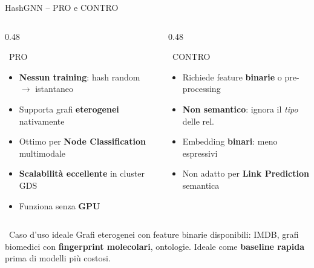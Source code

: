 \documentclass[aspectratio=169]{beamer}
\newcommand{\icoThumb}{\faThumbsUp}
\newcommand{\icoWarn}{\faExclamationTriangle}
\newcommand{\icoIdea}{\faLightbulb}
\newcommand{\icoCheck}{\faCheckCircle}
\newcommand{\icoX}{\faTimesCircle}
\newcommand{\icoThumb}{\textbf{+}}
\newcommand{\icoWarn}{\textbf{!}}
\newcommand{\icoIdea}{\textbf{$\bigstar$}}
\newcommand{\icoCheck}{\ding{52}}
\newcommand{\icoX}{\ding{56}}
\newcommand{\pro}{{\color{successGreen}\icoCheck}}
\newcommand{\con}{{\color{warningRed}\icoX}}
\begin{document}
\begin{frame}{HashGNN -- PRO e CONTRO}
  \begin{columns}[T]
    \begin{column}{0.48\textwidth}
      \begin{block}{\icoThumb\ PRO}
        \footnotesize
        \begin{itemize}
          \setlength{\itemsep}{1pt}
          \setlength{\parskip}{0pt}
          \item[\pro] \textbf{Nessun training}: hash random $\to$ istantaneo
          \item[\pro] Supporta grafi \textbf{eterogenei} nativamente
          \item[\pro] Ottimo per \textbf{Node Classification} multimodale
          \item[\pro] \textbf{Scalabilit\`a eccellente} in cluster GDS
          \item[\pro] Funziona senza \textbf{GPU}
        \end{itemize}
      \end{block}
    \end{column}
    \begin{column}{0.48\textwidth}
      \begin{alertblock}{\icoWarn\ CONTRO}
        \footnotesize
        \begin{itemize}
          \setlength{\itemsep}{1pt}
          \setlength{\parskip}{0pt}
          \item[\con] Richiede feature \textbf{binarie} o pre-processing
          \item[\con] \textbf{Non semantico}: ignora il \emph{tipo} delle rel.
          \item[\con] Embedding \textbf{binari}: meno espressivi
          \item[\con] Non adatto per \textbf{Link Prediction} semantica
        \end{itemize}
      \end{alertblock}
    \end{column}
  \end{columns}
  \vspace{-0.1cm}
  \begin{exampleblock}{\icoIdea\ Caso d'uso ideale}
    \footnotesize
    Grafi eterogenei con feature binarie disponibili: IMDB,
    grafi biomedici con \textbf{fingerprint molecolari}, ontologie. Ideale come
    \textbf{baseline rapida} prima di modelli pi\`u costosi.
  \end{exampleblock}
\end{frame}
\end{document}

